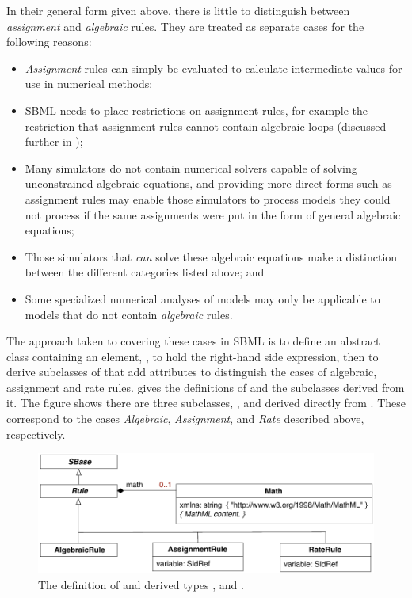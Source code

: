 In their general form given above, there is little to distinguish
between \emph{assignment} and \emph{algebraic} rules.  They are
treated as separate cases for the following reasons:
\begin{itemize}
  
\item \emph{Assignment} rules can simply be evaluated to calculate
  intermediate values for use in numerical methods;
  
\item SBML needs to place restrictions on assignment rules, for
  example the restriction that assignment rules cannot contain
  algebraic loops (discussed further in
  );

\item Many simulators do not contain numerical solvers capable of
  solving unconstrained algebraic equations, and providing more
  direct forms such as assignment rules may enable those
  simulators to process models they could not process if the same
  assignments were put in the form of general algebraic equations;
  
\item Those simulators that \emph{can} solve these algebraic
  equations make a distinction between the different categories
  listed above; and
  
\item Some specialized numerical analyses of models may only be
  applicable to models that do not contain \emph{algebraic} rules.

\end{itemize}

The approach taken to covering these cases in SBML is to define an
abstract \Rule class containing an element,
, to hold the right-hand side expression, then to
derive subclasses of \Rule that add attributes to
distinguish the cases of algebraic, assignment and rate rules.
 gives the definitions of \Rule and the
subclasses derived from it.  The figure shows there are three
subclasses, \AlgebraicRule, \AssignmentRule and \RateRule derived
directly from \Rule. These correspond to the cases
\emph{Algebraic}, \emph{Assignment}, and \emph{Rate} described
above, respectively.

\begin{figure}[htb]
  \centering
  \includegraphics[scale=0.8]{figs/rule-uml}
  \caption{The definition of \RuleUpright and derived types
      \AlgebraicRule, \AssignmentRule and \RateRule.}
  \label{fig:rules}
\end{figure}


